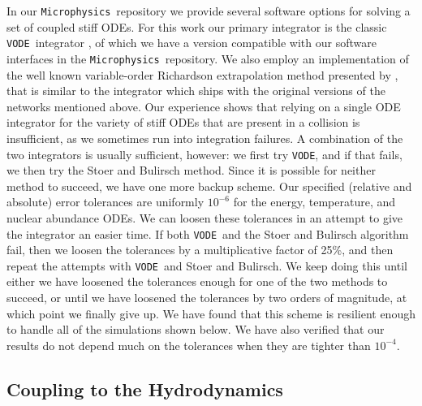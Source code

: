 \documentclass[twocolumn,numberedappendix]{../aastex6}
\newcommand{\microphysics}{\texttt{Microphysics}}
\newcommand{\vode}{\texttt{VODE}}
\begin{document}
In our \microphysics\ repository we provide several software options for
solving a set of coupled stiff ODEs. For this work our primary integrator
is the classic \vode\ integrator \citep{vode}, of which we have a version
compatible with our software interfaces in the \microphysics\ repository.
We also employ an implementation of the well known variable-order Richardson
extrapolation method presented by \citet{stoer:1980}, that is similar to the
integrator which ships with the original versions of the networks mentioned
above. Our experience shows that relying on a single ODE integrator for the
variety of stiff ODEs that are present in a collision is insufficient, as we
sometimes run into integration failures. A combination of the two integrators
is usually sufficient, however: we first try \vode, and if that fails, we then
try the Stoer and Bulirsch method. Since it is possible for neither method to
succeed, we have one more backup scheme. Our specified (relative and absolute)
error tolerances are uniformly $10^{-6}$ for the energy, temperature, and nuclear
abundance ODEs. We can loosen these tolerances in an attempt to give the integrator
an easier time. If both \vode\ and the Stoer and Bulirsch algorithm fail, then we
loosen the tolerances by a multiplicative factor of 25\%, and then repeat the attempts
with \vode\ and Stoer and Bulirsch. We keep doing this until either we have loosened
the tolerances enough for one of the two methods to succeed, or until we have loosened
the tolerances by two orders of magnitude, at which point we finally give up. We have
found that this scheme is resilient enough to handle all of the simulations shown below.
We have also verified that our results do not depend much on the tolerances when they
are tighter than $10^{-4}$.

\subsection{Coupling to the Hydrodynamics}
\label{sec:hydrocoupling}
\end{document}
